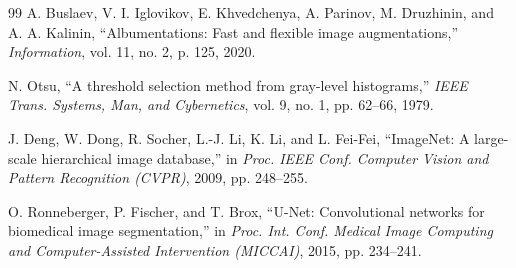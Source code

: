 \documentclass[10pt,a4paper]{article}
\begin{document}
\begin{thebibliography}{99}
A. Buslaev, V. I. Iglovikov, E. Khvedchenya, A. Parinov, M. Druzhinin, and A. A. Kalinin, ``Albumentations: Fast and flexible image augmentations,'' \textit{Information}, vol. 11, no. 2, p. 125, 2020.

N. Otsu, ``A threshold selection method from gray-level histograms,'' \textit{IEEE Trans. Systems, Man, and Cybernetics}, vol. 9, no. 1, pp. 62--66, 1979.

J. Deng, W. Dong, R. Socher, L.-J. Li, K. Li, and L. Fei-Fei, ``ImageNet: A large-scale hierarchical image database,'' in \textit{Proc. IEEE Conf. Computer Vision and Pattern Recognition (CVPR)}, 2009, pp. 248--255.

O. Ronneberger, P. Fischer, and T. Brox, ``U-Net: Convolutional networks for biomedical image segmentation,'' in \textit{Proc. Int. Conf. Medical Image Computing and Computer-Assisted Intervention (MICCAI)}, 2015, pp. 234--241.

\end{thebibliography}
\end{document}
